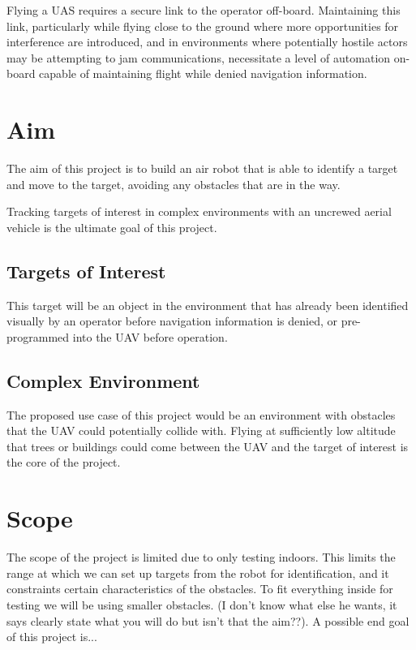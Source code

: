 \documentclass[]{report}
\begin{document}
Flying a UAS requires a secure link to the operator off-board. Maintaining this link, particularly while flying close to the ground where more opportunities for interference are introduced, and in environments where potentially hostile actors may be attempting to jam communications, necessitate a level of automation on-board capable of maintaining flight while denied navigation information.

\section{Aim}

The aim of this project is to build an air robot that is able to identify a target and move to the target, avoiding any obstacles that are in the way. 

Tracking targets of interest in complex environments with an uncrewed aerial vehicle is the ultimate goal of this project. 

\subsection{Targets of Interest}

This target will be an object in the environment that has already been identified visually by an operator before navigation information is denied, or pre-programmed into the UAV before operation.

\subsection{Complex Environment}

The proposed use case of this project would be an environment with obstacles that the UAV could potentially collide with. Flying at sufficiently low altitude that trees or buildings could come between the UAV and the target of interest is the core of the project.


\section{Scope}
The scope of the project is limited due to only testing indoors. This limits the range at which we can set up targets from the robot for identification, and it constraints certain characteristics of the obstacles. To fit everything inside for testing we will be using smaller obstacles. 
(I don't know what else he wants, it says clearly state what you will do but isn't that the aim??).
A possible end goal of this project is...  
 
\end{document}
